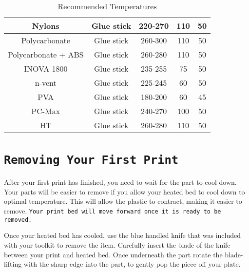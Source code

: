 \begin{table}[H]
\begin{center}
\begin{tabular}{||c c c c c||}
 		\hline
 		Nylons & Glue stick & 220-270 & 110 & 50 \\
 		\hline
 		Polycarbonate & Glue stick & 260-300 & 110 & 50 \\ 
 		\hline
 		Polycarbonate + ABS & Glue stick & 260-280 & 110 & 50 \\
 		\hline
 		INOVA 1800 & Glue stick & 235-255 & 75 & 50 \\
 		\hline
 		n-vent & Glue stick & 225-245 & 60 & 50 \\
 		\hline
  		PVA & Glue stick & 180-200 & 60 & 45 \\
 		\hline
 		PC-Max & Glue stick & 240-270 & 100 & 50 \\
 		\hline
 		HT & Glue stick & 260-280 & 110 & 50 \\ [1ex]
 		\hline
		\end{tabular}
		\caption{Recommended Temperatures}\label{tab:a}
	\end{center}
\end{table}


\section{\texttt{Removing Your First Print}}
After your first print has finished, you need to wait for the part to cool down.  Your parts will be easier to remove if you allow your heated bed to cool down to optimal temperature. This will allow the plastic to contract, making it easier to remove. \texttt{Your print bed will move forward once it is ready to be removed.}

Once your heated bed has cooled, use the blue handled knife that was included with your toolkit to remove the item. Carefully insert the blade of the knife between your print and heated bed. Once underneath the part rotate the blade- lifting with the sharp edge into the part, to gently pop the piece off your plate.

